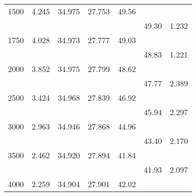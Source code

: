 \begin{table}[t!]
\begin{tabular*}{108mm}{@{}rrrrrrl}
1500&   4.245&  34.975& 27.753& 49.56&  \\
 &            &       &       &       & 49.30&  1.232\\
1750&   4.028&  34.973& 27.777& 49.03&  \\
 &            &       &       &       & 48.83&  1.221\\
2000&   3.852&  34.975& 27.799& 48.62&  \\
 &            &       &       &       & 47.77&  2.389\\
2500&   3.424&  34.968& 27.839& 46.92&  \\
 &            &       &       &       & 45.94&  2.297\\
3000&   2.963&  34.946& 27.868& 44.96&  \\
 &            &       &       &       & 43.40&  2.170\\
3500&   2.462&  34.920& 27.894& 41.84&  \\
 &            &       &       &       & 41.93&  2.097\\

4000&   2.259&  34.904& 27.901& 42.02\rule[-1ex]{0mm}{1ex}&  \\
\hline
\end{tabular*} \\[0.5ex]
\vspace{-3.ex}
\end{table}

